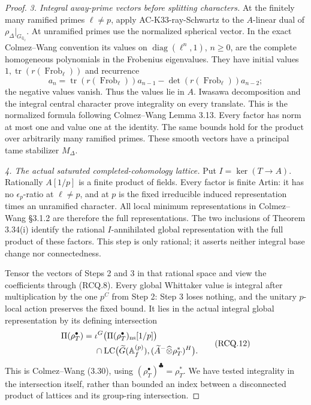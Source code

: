 \begin{proof}
\textit{3. Integral away-prime vectors before splitting characters.}
At the finitely many ramified primes \(\ell\ne p\), apply
AC-K33-ray-Schwartz to the \(A\)-linear dual of
\(\rho_\Delta|_{G_{\mathbb Q_\ell}}\).
At unramified primes use the normalized spherical vector.
In the exact Colmez--Wang convention its values on
\(\operatorname{diag}(\ell^n,1)\), \(n\ge0\), are the complete
homogeneous polynomials in the Frobenius eigenvalues. They have
initial values \(1,\operatorname{tr}(r(\operatorname{Frob}_\ell))\)
and recurrence
\[
 a_n=\operatorname{tr}(r(\operatorname{Frob}_\ell))a_{n-1}
                  -\det(r(\operatorname{Frob}_\ell))a_{n-2};
\]
the negative values vanish. Thus the values lie in \(A\).
Iwasawa decomposition and the integral central character prove
integrality on every translate. This is the normalized formula
following Colmez--Wang Lemma 3.13.
Every factor has norm at most one and value one at the identity.
The same bounds hold for the product over arbitrarily many ramified
primes. These smooth vectors have a principal tame stabilizer
\(M_\Delta\).

\textit{4. The actual saturated completed-cohomology lattice.}
Put \(I=\ker(T\to A)\).
Rationally \(A[1/p]\) is a finite product of fields.
Every factor is finite Artin: it has no
\(\epsilon_p\)-ratio at \(\ell\ne p\), and at \(p\) is the fixed
irreducible induced representation times an unramified character.
All local minimum representations in Colmez--Wang \S3.1.2 are
therefore the full representations. The two inclusions of
Theorem 3.34(i) identify the rational \(I\)-annihilated global
representation with the full product of these factors.
This step is only rational; it asserts neither integral base change
nor connectedness.

Tensor the vectors of Steps 2 and 3 in that rational space and
view the coefficients through (RCQ.8).
Every global Whittaker value is integral after multiplication by
the one \(p^C\) from Step 2: Step 3 loses nothing, and the unitary
\(p\)-local action preserves the fixed bound.
It lies in the actual integral global representation by its defining
intersection
\[
 \begin{split}
 \Pi(\rho_T^\bullet)
 ={}&\iota^G\bigl(\Pi(\rho_T^\bullet)_{\rm ns}[1/p]\bigr)\\
 &{}\cap {\rm LC}\bigl(\widetilde G(\mathbb A_f^{(p)}),
              (\widetilde A^-\widehat\otimes\rho_T^*)^H\bigr).
 \end{split}
 \tag{RCQ.12}
\]
This is Colmez--Wang (3.30), using
\((\rho_T^\bullet)^\clubsuit=\rho_T^*\).
We have tested integrality in the intersection itself, rather than
bounded an index between a disconnected product of lattices and
its group-ring intersection.


\end{proof}
